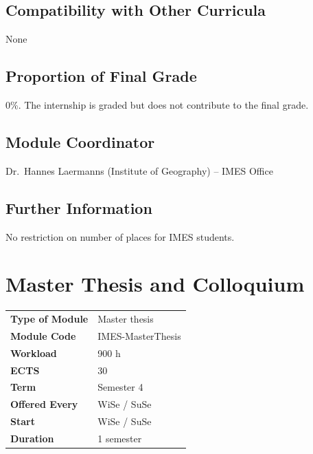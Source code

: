 \documentclass[
  letterpaper,
  10pt,
  openany]{book}
\begin{document}
\section*{Compatibility with Other
Curricula}\label{compatibility-with-other-curricula-6}


None

\section*{Proportion of Final Grade}\label{proportion-of-final-grade-6}


0\%. The internship is graded but does not contribute to the final
grade.

\section*{Module Coordinator}\label{module-coordinator-6}


Dr.~Hannes Laermanns (Institute of Geography) -- IMES Office

\section*{Further Information}\label{further-information-6}


No restriction on number of places for IMES students.

\chapter*{Master Thesis and
Colloquium}\label{master-thesis-and-colloquium}


\begin{longtable}[]{@{}ll@{}}
\toprule\noalign{}
\endhead
\bottomrule\noalign{}
\endlastfoot
\textbf{Type of Module} & Master thesis \\
\textbf{Module Code} & IMES-MasterThesis \\
\textbf{Workload} & 900 h \\
\textbf{ECTS} & 30 \\
\textbf{Term} & Semester 4 \\
\textbf{Offered Every} & WiSe / SuSe \\
\textbf{Start} & WiSe / SuSe \\
\textbf{Duration} & 1 semester \\
\end{longtable}
\end{document}
